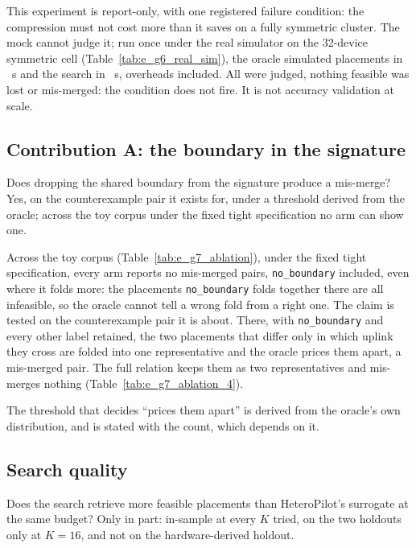 This experiment is report-only, with one registered failure condition: the
compression must not cost more than it saves on a fully symmetric cluster. The
mock cannot judge it; run once under the real simulator on the 32-device
symmetric cell (Table~\ref{tab:e_g6_real_sim}), the oracle simulated
\egsixRealOracleSims{} placements in \egsixRealOracleS{}~s and the search
\egsixRealProposedSims{} in \egsixRealProposedS{}~s, overheads included. All
were judged, nothing feasible was lost or mis-merged: the condition does not
fire. It is not accuracy validation at scale.



\subsection{Contribution A: the boundary in the signature}

Does dropping the shared boundary from the signature produce a mis-merge? Yes,
on the counterexample pair it exists for, under a threshold derived from the
oracle; across the toy corpus under the fixed tight specification no arm can
show one.



Across the toy corpus (Table~\ref{tab:e_g7_ablation}), under
the fixed tight specification, every arm reports no mis-merged pairs,
\texttt{no\_boundary} included, even where it folds more: the placements
\texttt{no\_boundary} folds together there are all infeasible, so the oracle
cannot tell a wrong fold from a right one. The
claim is tested on the counterexample pair it is about. There, with
\texttt{no\_boundary} and every other label retained, the two placements that
differ only in which uplink they cross are folded into one representative and
the oracle prices them apart, a mis-merged pair. The full relation keeps them
as two representatives and mis-merges nothing
(Table~\ref{tab:e_g7_ablation_4}).



The threshold that decides ``prices them apart'' is derived from the oracle's
own distribution, and is stated with the count, which depends on it.

\subsection{Search quality}

Does the search retrieve more feasible placements than HeteroPilot's surrogate
at the same budget? Only in part: in-sample at every $K$ tried, on the two
holdouts only at $K = 16$, and not on the hardware-derived holdout.

